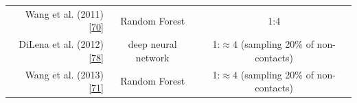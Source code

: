 \documentclass[11pt,a4paper,twoside]{book}
\theoremstyle{definition}
\theoremstyle{definition}
\theoremstyle{remark}
\begin{document}
\begin{longtable}[]{@{}rcc@{}}
\begin{minipage}[t]{0.32\columnwidth}
Wang et al. (2011) {[}\protect\hyperlink{ref-Wang2011}{70}{]}\strut
\end{minipage} & \begin{minipage}[t]{0.19\columnwidth}\centering\strut
Random Forest\strut
\end{minipage} & \begin{minipage}[t]{0.29\columnwidth}\centering\strut
1:4\strut
\end{minipage}\tabularnewline
\begin{minipage}[t]{0.32\columnwidth}\raggedleft\strut
DiLena et al. (2012) {[}\protect\hyperlink{ref-DiLena2012a}{78}{]}\strut
\end{minipage} & \begin{minipage}[t]{0.19\columnwidth}\centering\strut
deep neural network\strut
\end{minipage} & \begin{minipage}[t]{0.29\columnwidth}\centering\strut
1:\(\approx \!4\) (sampling 20\% of non-contacts)\strut
\end{minipage}\tabularnewline
\begin{minipage}[t]{0.32\columnwidth}\raggedleft\strut
Wang et al. (2013) {[}\protect\hyperlink{ref-Wang2013}{71}{]}\strut
\end{minipage} & \begin{minipage}[t]{0.19\columnwidth}\centering\strut
Random Forest\strut
\end{minipage} & \begin{minipage}[t]{0.29\columnwidth}\centering\strut
1:\(\approx 4\) (sampling 20\% of non-contacts)\strut
\end{minipage}\tabularnewline
\bottomrule
\end{longtable}
\end{document}

